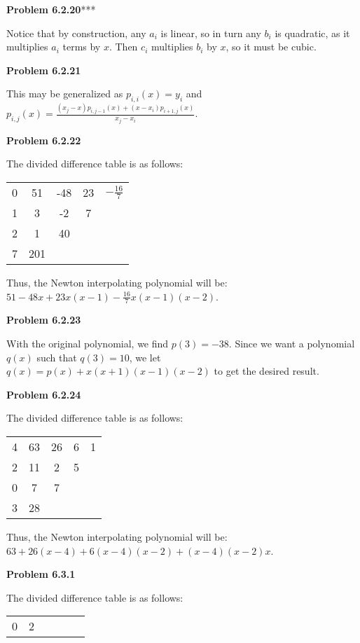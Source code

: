 \documentclass{article}
\newcommand{\Problem}[1]{\textbf{Problem #1}}
\begin{document}
\Problem{6.2.20}***

Notice that by construction, any $a_i$ is linear, so in turn any $b_i$ is quadratic, as it multiplies $a_i$ terms by $x$. Then $c_i$ multiplies $b_i$ by $x$, so it must be cubic. 

\Problem{6.2.21}

This may be generalized as $p_{i,i}(x) = y_i$ and $p_{i,j}(x) = \displaystyle\frac{(x_{j}-x)p_{i,j-1}	(x) + (x - x_i)p_{i+1,j	}(x)}{x_j - x_i}$.

\Problem{6.2.22}

The divided difference table is as follows:
\begin{center}
\begin{tabular}{cc|ccc}
	0 & 51 & -48 & 23 & $-\frac{16}{7}$\\
	1 & 3 & -2 & 7 & \\
	2 & 1 & 40 & & \\
	7 & 201 & & &
\end{tabular}
\end{center}

Thus, the Newton interpolating polynomial will be: $51 - 48x +23x(x-1) - \frac{16}{7}x(x-1)(x-2)$. 

\Problem{6.2.23}

With the original polynomial, we find $p(3) = -38$. Since we want a polynomial $q(x)$ such that $q(3) = 10$, we let $q(x) = p(x) + x(x+1)(x-1)(x-2)$ to get the desired result.

\Problem{6.2.24}

The divided difference table is as follows:
\begin{center}
\begin{tabular}{cc|ccc}
	4 & 63 & 26 & 6 & 1 \\
	2 & 11 & 2 & 5 & \\
	0 & 7 & 7 & & \\
	3 & 28 & & & \\	
\end{tabular}
\end{center}

Thus, the Newton interpolating polynomial will be: $63 + 26(x-4) + 6(x-4)(x-2) + (x-4)(x-2)x$.

\Problem{6.3.1}

The divided difference table is as follows:
\begin{center}
\begin{tabular}{cc|cccc}
	0 & 2 & & & & \\
\end{tabular}	
\end{center}
\end{document}
